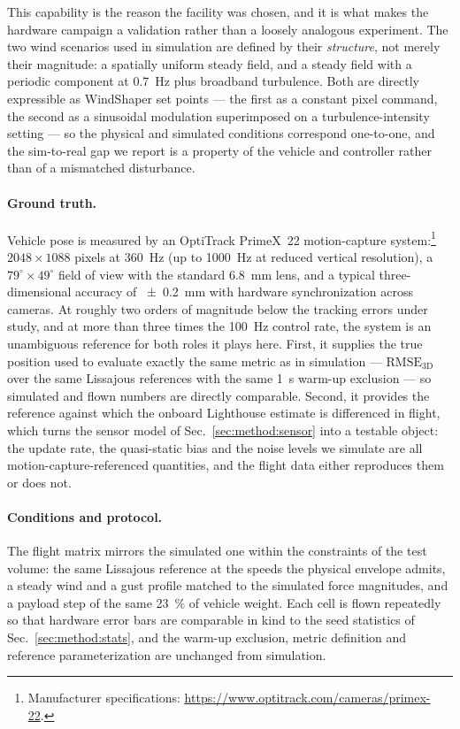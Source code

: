 This capability is the reason the facility was chosen, and it is what makes the
hardware campaign a validation rather than a loosely analogous experiment. The two wind
scenarios used in simulation are defined by their \emph{structure}, not merely their
magnitude: a spatially uniform steady field, and a steady field with a periodic
component at \SI{0.7}{\hertz} plus broadband turbulence. Both are directly expressible
as WindShaper set points --- the first as a constant pixel command, the second as a
sinusoidal modulation superimposed on a turbulence-intensity setting --- so the physical
and simulated conditions correspond one-to-one, and the sim-to-real gap we report is a
property of the vehicle and controller rather than of a mismatched disturbance.

\paragraph{Ground truth.}
Vehicle pose is measured by an OptiTrack PrimeX~22 motion-capture
system:\footnote{Manufacturer specifications: \url{https://www.optitrack.com/cameras/primex-22}.} $2048\times1088$ pixels at \SI{360}{\hertz} (up to
\SI{1000}{\hertz} at reduced vertical resolution), a $79^\circ\times49^\circ$ field of
view with the standard \SI{6.8}{\milli\meter} lens, and a typical three-dimensional
accuracy of \SI{\pm0.2}{\milli\meter} with hardware synchronization across cameras. At
roughly two orders of magnitude below the tracking errors under study, and at more than
three times the \SI{100}{\hertz} control rate, the system is an unambiguous reference
for both roles it plays here. First, it supplies the true position used to evaluate
exactly the same metric as in simulation --- $\mathrm{RMSE}_{\mathrm{3D}}$ over the same
Lissajous references with the same \SI{1}{\second} warm-up exclusion --- so simulated
and flown numbers are directly comparable. Second, it provides the reference against
which the onboard Lighthouse estimate is differenced in flight, which turns the sensor
model of Sec.~\ref{sec:method:sensor} into a testable object: the update rate, the
quasi-static bias and the noise levels we simulate are all motion-capture-referenced
quantities, and the flight data either reproduces them or does not.

\paragraph{Conditions and protocol.}
The flight matrix mirrors the simulated one within the constraints of the test volume:
the same Lissajous reference at the speeds the physical envelope admits, a steady wind
and a gust profile matched to the simulated force magnitudes, and a payload step of the
same \SI{23}{\percent} of vehicle weight. Each cell is flown repeatedly so that hardware
error bars are comparable in kind to the seed statistics of
Sec.~\ref{sec:method:stats}, and the warm-up exclusion, metric definition and reference
parameterization are unchanged from simulation.

